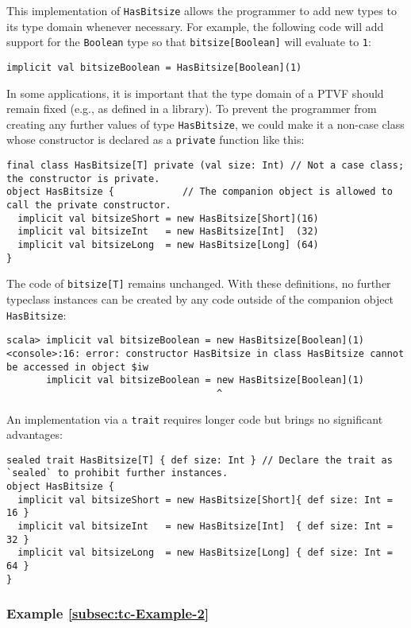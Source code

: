 This implementation of \lstinline!HasBitsize! allows the programmer
to add new types to its type domain whenever necessary. For example,
the following code will add support for the \lstinline!Boolean! type
so that \lstinline!bitsize[Boolean]! will evaluate to \lstinline!1!:
\begin{lstlisting}
implicit val bitsizeBoolean = HasBitsize[Boolean](1)
\end{lstlisting}
In some applications, it is important that the type domain of a PTVF
should remain fixed (e.g., as defined in a library). To prevent the
programmer from creating any further values of type \lstinline!HasBitsize!,
we could make it a non-case class whose constructor is declared as
a \lstinline!private! function like this:
\begin{lstlisting}
final class HasBitsize[T] private (val size: Int) // Not a case class; the constructor is private.
object HasBitsize {            // The companion object is allowed to call the private constructor.
  implicit val bitsizeShort = new HasBitsize[Short](16)
  implicit val bitsizeInt   = new HasBitsize[Int]  (32)
  implicit val bitsizeLong  = new HasBitsize[Long] (64)
}
\end{lstlisting}
The code of \lstinline!bitsize[T]! remains unchanged. With these
definitions, no further typeclass instances can be created by any
code outside of the companion object \lstinline!HasBitsize!:
\begin{lstlisting}
scala> implicit val bitsizeBoolean = new HasBitsize[Boolean](1)
<console>:16: error: constructor HasBitsize in class HasBitsize cannot be accessed in object $iw
       implicit val bitsizeBoolean = new HasBitsize[Boolean](1)
                                     ^
\end{lstlisting}

An implementation via a \lstinline!trait! requires longer code but
brings no significant advantages:
\begin{lstlisting}
sealed trait HasBitsize[T] { def size: Int } // Declare the trait as `sealed` to prohibit further instances.
object HasBitsize {
  implicit val bitsizeShort = new HasBitsize[Short]{ def size: Int = 16 }
  implicit val bitsizeInt   = new HasBitsize[Int]  { def size: Int = 32 }
  implicit val bitsizeLong  = new HasBitsize[Long] { def size: Int = 64 }
}
\end{lstlisting}


\subsubsection{Example \label{subsec:tc-Example-2}\ref{subsec:tc-Example-2}}

